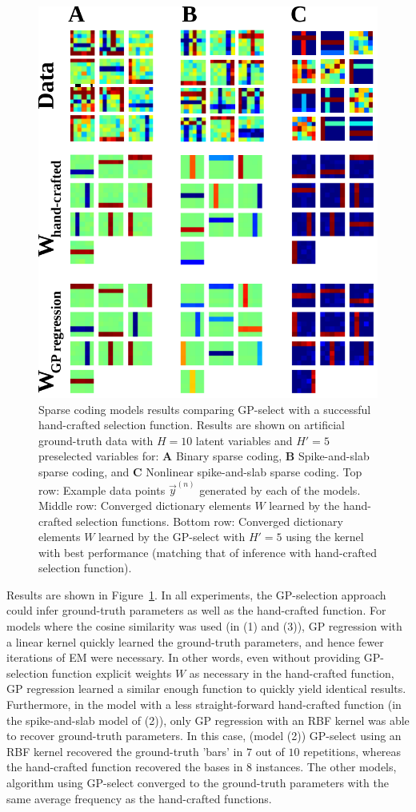 \begin{figure}[h]
\begin{center}
\includegraphics[width=.45\textwidth]{figs/sparsecoding/bars-test.pdf}
\caption{Sparse coding models results comparing GP-select with a successful hand-crafted selection function.
Results are shown on artificial ground-truth data with $H=10$ latent variables and $H'=5$ preselected variables for: \textbf{A} Binary sparse coding, \textbf{B} Spike-and-slab sparse coding, and \textbf{C} Nonlinear spike-and-slab sparse coding.
Top row: Example data points $\vec{y}^{(n)}$ generated by each of the models.
Middle row: Converged dictionary elements $W$ learned by the hand-crafted selection functions.
Bottom row: Converged dictionary elements $W$ learned by the GP-select with $H'=5$ using the kernel with best performance (matching that of inference with hand-crafted selection function).
}\label{fig:sparse}
\end{center}
\end{figure}

Results are shown in Figure~\ref{fig:sparse}.
In all experiments, the GP-selection approach could infer ground-truth parameters as well as the hand-crafted function.
For models where the cosine similarity was used (in (1) and (3)), GP regression with a linear kernel quickly learned the ground-truth parameters, and hence fewer iterations of EM were necessary.
In other words, even without providing GP-selection function explicit weights $W$ as necessary in the hand-crafted function, GP regression learned a similar enough function to quickly yield identical results.
Furthermore, in the model with a less straight-forward hand-crafted function (in the spike-and-slab model of (2)), only GP regression with an RBF kernel was able to recover ground-truth parameters.
In this case, (model (2)) GP-select using an RBF kernel recovered the ground-truth 'bars' in $7$ out of $10$ repetitions, whereas the hand-crafted function recovered the bases in $8$ instances.
The other models, algorithm using GP-select converged to the ground-truth parameters with the same average frequency as the hand-crafted functions.

